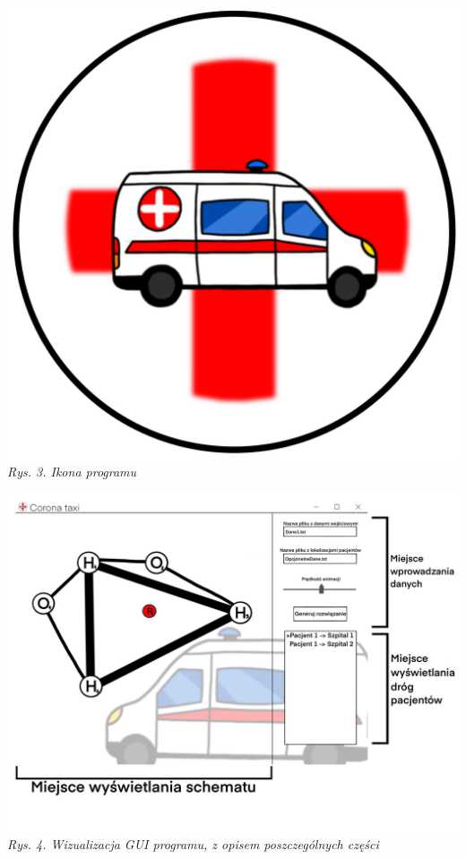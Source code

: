 \documentclass{article}
\begin{document}
    \begin{center}
        \includegraphics[scale = 0.05]{Ikonka.jpg}
        \textit{\\Rys. 3. Ikona programu\\}
        
        \includegraphics[scale = 0.18]{SchematGUI.jpg}
        \textit{\\Rys. 4. Wizualizacja GUI programu, z opisem poszczególnych części\\}
    \end{center}
\end{document}

